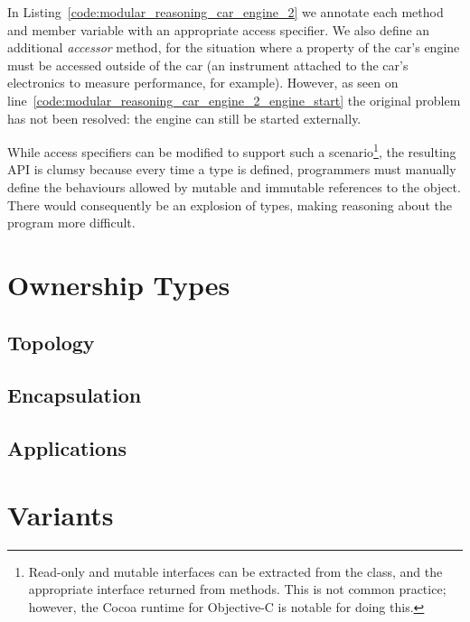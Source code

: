 \documentclass{acm_proc_article-sp}
\begin{document}
In Listing~\ref{code:modular_reasoning_car_engine_2} we annotate each method 
and member variable with an appropriate access specifier. We also define an 
additional \emph{accessor} method, for the situation where a property of the 
car's engine must be accessed outside of the car (an instrument attached to the 
car's electronics to measure performance, for example). However, as seen on 
line~\ref{code:modular_reasoning_car_engine_2_engine_start} the original 
problem has not been resolved: the engine can still be started externally.

While access specifiers can be modified to support such a 
scenario\footnote{Read-only and mutable interfaces can be extracted from the 
class, and the appropriate interface returned from methods. This is not common 
practice; however, the Cocoa runtime for Objective-C is notable for doing 
this.}, the resulting API is clumsy because every time a type is defined, 
programmers must manually define the behaviours allowed by mutable and 
immutable references to the object. There would consequently be an explosion of 
types, making reasoning about the program more difficult.

\section{Ownership Types}
\label{sec:ownership}


\subsection{Topology}
\label{subsec:topo}

\lipsum[3]

\subsection{Encapsulation}
\label{subsec:encap}

\lipsum[4]

\subsection{Applications}
\label{subsec:apps}

\lipsum[5]




\section{Variants}
\label{sec:variants}
\end{document}
